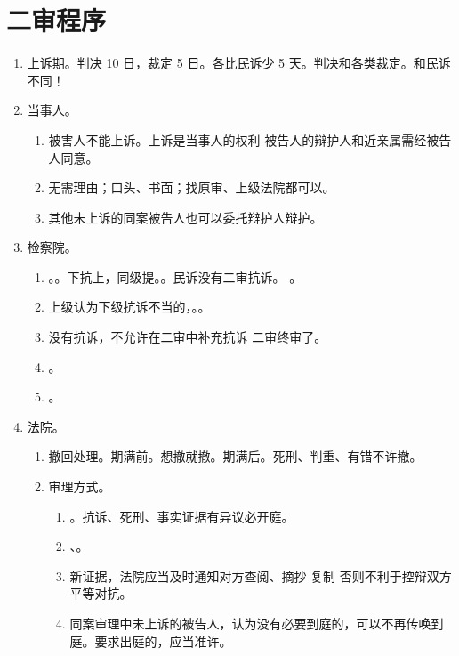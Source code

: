 \section{二审程序}
\begin{enumerate}
  \item 上诉期。判决 10 日，裁定 5 日。各比民诉少 5 天。判决和各类裁定。和民诉不同！
  \item 当事人。
        \begin{enumerate}
          \item 被害人不能上诉。上诉是当事人的权利 \yjt 被告人的辩护人和近亲属需经被告人同意。
          \item 无需理由；口头、书面；找原审、上级法院都可以。
          \item 其他未上诉的同案被告人也可以委托辩护人辩护。
        \end{enumerate}
  \item 检察院。
        \begin{enumerate}
          \item {}。。下抗上，同级提。。民诉没有二审抗诉。
                。
          \item 上级认为下级抗诉不当的，。。
          \item 没有抗诉，不允许在二审中补充抗诉 \yjt 二审终审了。
          \item {}。
          \item {}。
        \end{enumerate}
  \item 法院。
        \begin{enumerate}
          \item 撤回处理。\yi 期满前。想撤就撤。\er 期满后。死刑、判重、有错不许撤。
          \item 审理方式。
                \begin{enumerate}
                  \item {}。抗诉、死刑、事实证据有异议必开庭。
                  \item {}、。
                  \item 新证据，法院应当及时通知对方查阅、摘抄 \hz 复制 \yjt 否则不利于控辩双方平等对抗。
                  \item 同案审理中未上诉的被告人，认为没有必要到庭的，可以不再传唤到庭。要求出庭的，应当准许。

\end{enumerate}
\end{enumerate}
\end{enumerate}
